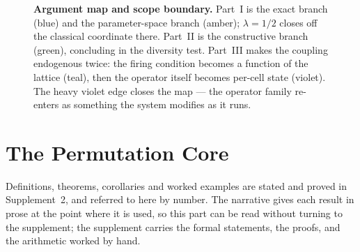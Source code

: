 \documentclass[man,12pt,floatsintext,donotrepeattitle]{apa7}
\begin{document}
\begin{figure}[H]
\caption{\textbf{Argument map and scope boundary.} Part~I is the exact branch (blue) and
the parameter-space branch (amber); $\lambda=1/2$ closes off the classical coordinate
there. Part~II is the constructive branch (green), concluding in the diversity test.
Part~III makes the coupling endogenous twice: the firing condition becomes a function of
the lattice (teal), then the operator itself becomes per-cell state (violet). The heavy
violet edge closes the map --- the operator family re-enters as something the system
modifies as it runs.}
\label{fig:map}
\end{figure}

\part{The Permutation Core}

\noindent Definitions, theorems, corollaries and worked examples are stated and proved in
Supplement~2, and referred to here by number. The narrative gives each result in prose at
the point where it is used, so this part can be read without turning to the supplement;
the supplement carries the formal statements, the proofs, and the arithmetic worked by hand.

\label{part:core}
\end{document}
